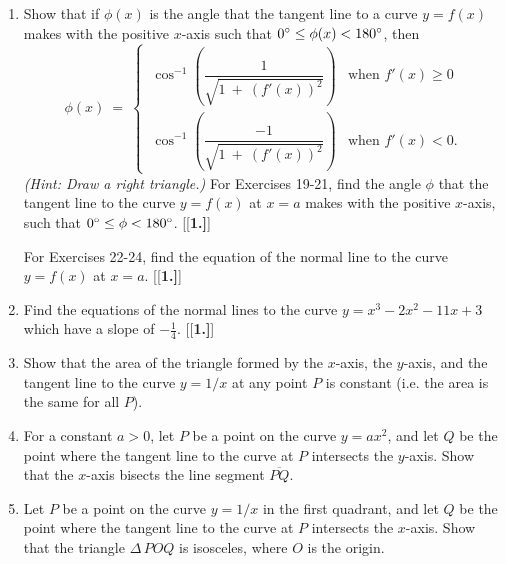{\begin{enumerate}[\bfseries 1.]
\begin{multicols}{3}
 \end{multicols}
 \item Show that if $\phi(x)$ is the angle that the tangent line to a curve
  $y = f(x)$ makes with the positive $x$-axis such that
  $0^\circ \le \phi(x) < 180^\circ$, then
\[
\phi(x) ~=~
\begin{cases}
~\cos^{-1} \left(\dfrac{1}{\sqrt{1 ~+~ (f'(x))^2}}\right) & \text{when $f'(x) \ge 0$}\\[12pt]
~\cos^{-1} \left(\dfrac{-1}{\sqrt{1 ~+~ (f'(x))^2}}\right) & \text{when $f'(x) < 0$.}
\end{cases}
\]
\emph{(Hint: Draw a right triangle.)}
\noindent For Exercises 19-21, find the angle $\phi$ that the tangent line to the
curve $y=f(x)$ at $x=a$ makes with the positive $x$-axis, such that
$0^\circ \le \phi < 180^\circ$.
[{[\bfseries 1.]}]
\par\noindent For Exercises 22-24, find the equation of the normal line to the
curve $y = f(x)$ at $x = a$.
[{[\bfseries 1.]}]
\item Find the equations of the normal lines to the curve
  $y = x^3 - 2x^2 - 11x + 3$ which have a slope of $-\frac{1}{4}$.
[{[\bfseries 1.]}]
 \item Show that the area of the triangle formed by the $x$-axis, the $y$-axis, and the
tangent line to the curve $y = 1/x$ at any point $P$ is constant (i.e. the area is the
same for all $P$).
 \item For a constant $a > 0$, let $P$ be a point on the curve $y = ax^2$, and let $Q$
be the point where the tangent line to the curve at $P$ intersects the $y$-axis. Show that
the $x$-axis bisects the line segment $\overline{PQ}$.
 \item Let $P$ be a point on the curve $y = 1/x$ in the first quadrant, and let $Q$ be the
point where the tangent line to the curve at $P$ intersects the $x$-axis. Show that the
triangle $\Delta\,POQ$ is isosceles, where $O$ is the origin.
\end{enumerate}}
\newpage
